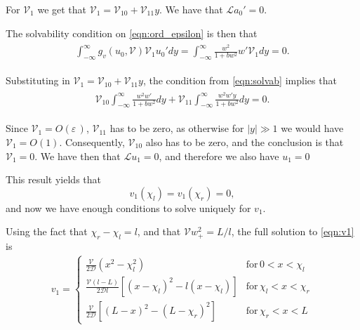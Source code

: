 \documentclass[a4paper,10pt]{article}
\newcommand{\Ep}{\ensuremath{\varepsilon\,}}
\newcommand{\DD}{\ensuremath{\mathcal{D}}}
\newcommand{\VV}{\ensuremath{\mathcal{V}}}
\newcommand{\LL}{\ensuremath{\mathcal{L}}}
\begin{document}
For $\VV_1$ we get that $\VV_1 = \VV_{10} + \VV_{11}y$. We have that $\LL a_0' = 0$.

The solvability condition on \eqref{eqn:ord_epsilon} is then that 
% 
\begin{equation}
\label{eqn:solvab}
\begin{split}
\begin{aligned}
\int_{-\infty}^{\infty}g_v(u_0,\VV)\VV_1u_0'dy = \int_{-\infty}^{\infty}\frac{w^2}{1+bw^2}w'\VV_1dy = 0.
\end{aligned}
\end{split}
\end{equation}
% 

Substituting in $\VV_1 = \VV_{10} + \VV_{11}y$, the condition from \eqref{eqn:solvab} implies that
% 
\begin{equation}
\label{eqn:solvab2}
\begin{split}
\begin{aligned}
\VV_{10}\int_{-\infty}^{\infty}\frac{w^2w'}{1+bw^2}dy + \VV_{11}\int_{-\infty}^{\infty}\frac{w^2w'y}{1+bw^2}dy = 0.
\end{aligned}
\end{split}
\end{equation}
% 

Since $\VV_1 = O(\Ep)$, $\VV_{11}$ has to be zero, as otherwise for $|y|\gg 1$ we would have $\VV_1 = O(1)$. Consequently, $\VV_{10}$ also has to be zero, and the conclusion is that $\VV_1=0$. We have then that $\LL u_1 = 0$, and therefore we also have $u_1 = 0$

This result yields that 
% 
\begin{equation}
  v_1(\chi_l)  = v_1(\chi_r) = 0,
\end{equation}
% 
and now we have enough conditions to solve uniquely for $v_1$.

Using the fact that $\chi_r-\chi_l = l$, and that $\VV w_+^2 = L/l$, the full solution to \eqref{eqn:v1} is
% 
\begin{equation}
\label{eqn:v1_full}
	\begin{split}
	v_1
   = \left\{
	\begin{matrix}
		\frac{\VV}{2\DD}(x^2-\chi_l^2)& \mathrm{for}\hspace{2pt}0< x<\chi_l \\
		\frac{\VV(l-L)}{2\DD l}[(x-\chi_l)^2 - l(x-\chi_l)]& \mathrm{for}\hspace{2pt}\chi_l< x<\chi_r\\
		\frac{\VV}{2\DD}[(L-x)^2-(L-\chi_r)^2]& \mathrm{for}\hspace{2pt}\chi_r<x<L
	\end{matrix}\right.
	\end{split}
\end{equation}
% 
\end{document}
